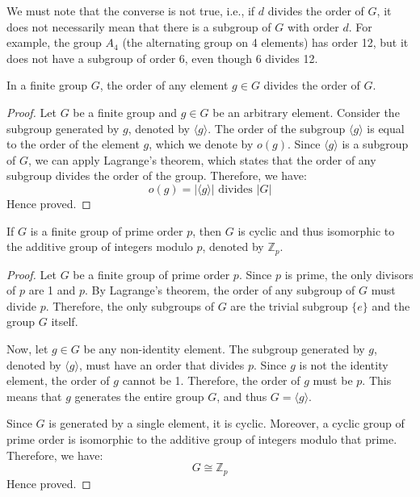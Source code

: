 \documentclass[openany]{book}
\begin{document}
\begin{mynote}
    We must note that the converse is not true, i.e., if \( d \) divides the order of \( G \), it does not necessarily mean that there is a subgroup of \( G \) with order \( d \). For example, the group \( A_4 \) (the alternating group on 4 elements) has order 12, but it does not have a subgroup of order 6, even though 6 divides 12.
\end{mynote}
\begin{corollary}
    In a finite group \( G \), the order of any element \( g \in G \) divides the order of \( G \).
\end{corollary}
\begin{proof}
    Let \( G \) be a finite group and \( g \in G \) be an arbitrary element. Consider the subgroup generated by \( g \), denoted by \( \langle g \rangle \). The order of the subgroup \( \langle g \rangle \) is equal to the order of the element \( g \), which we denote by \( o(g) \). Since \( \langle g \rangle \) is a subgroup of \( G \), we can apply Lagrange's theorem, which states that the order of any subgroup divides the order of the group. Therefore, we have:
    \[
    o(g) = |\langle g \rangle| \text{ divides } |G|
    \]
    Hence proved.
\end{proof}
\begin{corollary}
    If \( G \) is a finite group of prime order \( p \), then \( G \) is cyclic and thus isomorphic to the additive group of integers modulo \( p \), denoted by \( \mathbb{Z}_p \).
\end{corollary}
\begin{proof}
    Let \( G \) be a finite group of prime order \( p \). Since \( p \) is prime, the only divisors of \( p \) are 1 and \( p \). By Lagrange's theorem, the order of any subgroup of \( G \) must divide \( p \). Therefore, the only subgroups of \( G \) are the trivial subgroup \( \{ e \} \) and the group \( G \) itself. 

    Now, let \( g \in G \) be any non-identity element. The subgroup generated by \( g \), denoted by \( \langle g \rangle \), must have an order that divides \( p \). Since \( g \) is not the identity element, the order of \( g \) cannot be 1. Therefore, the order of \( g \) must be \( p \). This means that \( g \) generates the entire group \( G \), and thus \( G = \langle g \rangle \).

    Since \( G \) is generated by a single element, it is cyclic. Moreover, a cyclic group of prime order is isomorphic to the additive group of integers modulo that prime. Therefore, we have:
    \[
    G \cong \mathbb{Z}_p
    \]
    Hence proved.
\end{proof}
\end{document}
